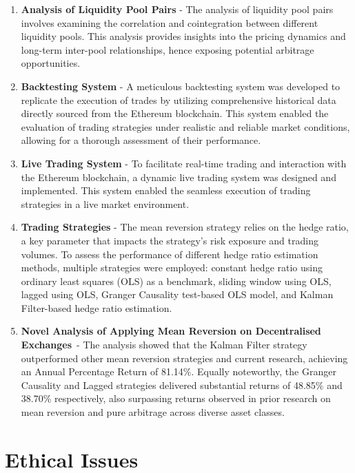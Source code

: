 \begin{enumerate}[wide, labelwidth=!, labelindent=2ex]
    \itemsep-0.1em
    \item \textbf{Analysis of Liquidity Pool Pairs} - The analysis of liquidity pool pairs involves examining the correlation and cointegration between different liquidity pools. This analysis provides insights into the pricing dynamics and long-term inter-pool relationships, hence exposing potential arbitrage opportunities. 
    \item \textbf{Backtesting System} - A meticulous backtesting system was developed to replicate the execution of trades by utilizing comprehensive historical data directly sourced from the Ethereum blockchain. This system enabled the evaluation of trading strategies under realistic and reliable market conditions, allowing for a thorough assessment of their performance.
    \item \textbf{Live Trading System} - To facilitate real-time trading and interaction with the Ethereum blockchain, a dynamic live trading system was designed and implemented. This system enabled the seamless execution of trading strategies in a live market environment.
    \item \textbf{Trading Strategies} - The mean reversion strategy relies on the hedge ratio, a key parameter that impacts the strategy's risk exposure and trading volumes. To assess the performance of different hedge ratio estimation methods, multiple strategies were employed: constant hedge ratio using ordinary least squares (OLS) as a benchmark, sliding window using OLS, lagged using OLS, Granger Causality test-based OLS model, and Kalman Filter-based hedge ratio estimation.
    \item \textbf{Novel Analysis of Applying Mean Reversion on Decentralised Exchanges}~- The analysis showed that the Kalman Filter strategy outperformed other mean reversion strategies and current research, achieving an Annual Percentage Return of 81.14\%. Equally noteworthy, the Granger Causality and Lagged strategies delivered substantial returns of 48.85\% and 38.70\% respectively, also surpassing returns observed in prior research on mean reversion and pure arbitrage across diverse asset classes.
\end{enumerate}

\section{Ethical Issues}

